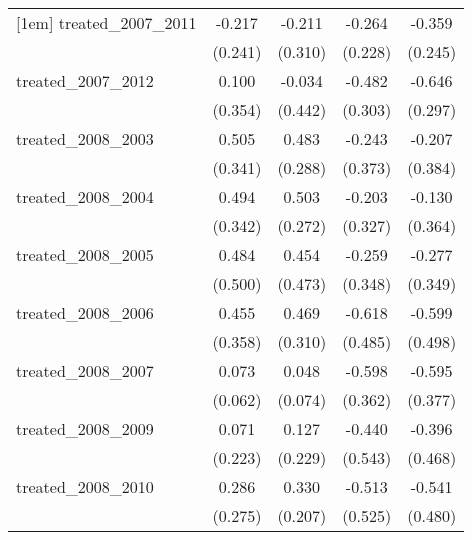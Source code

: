 {\begin{tabular}{l*{4}{c}}
[1em]
treated\_2007\_2011&      -0.217         &      -0.211         &      -0.264         &      -0.359         \\
            &     (0.241)         &     (0.310)         &     (0.228)         &     (0.245)         \\
[1em]
treated\_2007\_2012&       0.100         &      -0.034         &      -0.482         &      -0.646\sym{*}  \\
            &     (0.354)         &     (0.442)         &     (0.303)         &     (0.297)         \\
[1em]
treated\_2008\_2003&       0.505         &       0.483         &      -0.243         &      -0.207         \\
            &     (0.341)         &     (0.288)         &     (0.373)         &     (0.384)         \\
[1em]
treated\_2008\_2004&       0.494         &       0.503         &      -0.203         &      -0.130         \\
            &     (0.342)         &     (0.272)         &     (0.327)         &     (0.364)         \\
[1em]
treated\_2008\_2005&       0.484         &       0.454         &      -0.259         &      -0.277         \\
            &     (0.500)         &     (0.473)         &     (0.348)         &     (0.349)         \\
[1em]
treated\_2008\_2006&       0.455         &       0.469         &      -0.618         &      -0.599         \\
            &     (0.358)         &     (0.310)         &     (0.485)         &     (0.498)         \\
[1em]
treated\_2008\_2007&       0.073         &       0.048         &      -0.598         &      -0.595         \\
            &     (0.062)         &     (0.074)         &     (0.362)         &     (0.377)         \\
[1em]
treated\_2008\_2009&       0.071         &       0.127         &      -0.440         &      -0.396         \\
            &     (0.223)         &     (0.229)         &     (0.543)         &     (0.468)         \\
[1em]
treated\_2008\_2010&       0.286         &       0.330         &      -0.513         &      -0.541         \\
            &     (0.275)         &     (0.207)         &     (0.525)         &     (0.480)         \\

\end{tabular}}
